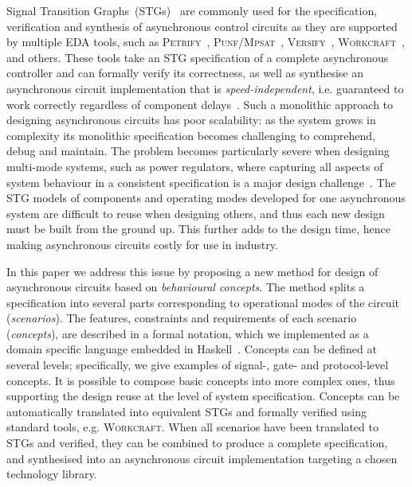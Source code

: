 \documentclass[british, journal]{IEEEtran}
\newcommand{\noun}[1]{\textsc{#1}}
\begin{document}
Signal Transition Graphs~(STGs)~\cite{Chu_1987_phd}\cite{Rosenblum_1985_tpn}
are commonly used for the specification,
verification and synthesis of asynchronous control circuits as they are
supported by multiple EDA tools, such as \noun{Petrify}~\cite{Cortadella},
\noun{Punf}/\noun{Mpsat}~\cite{khomenko2004detecting}\cite{khomenko2011mp}, \noun{Versify}~\cite{i1997formal},
\noun{Workcraft}~\cite{workcraft2016}\cite{Workcraft_website}, and others.
These tools take an STG specification of a complete asynchronous controller and
can formally verify its correctness, as well as synthesise an asynchronous
circuit implementation that is \emph{speed-independent}, i.e. guaranteed
to work correctly regardless of component delays~\cite{Muller_1959_ts}.
Such a monolithic approach to designing asynchronous circuits has
poor scalability: as the system grows in complexity its monolithic
specification becomes challenging to comprehend, debug and maintain. The problem
becomes particularly severe when designing multi-mode systems, such as
power regulators, where capturing all aspects of system behaviour in a
consistent specification is a major design
challenge~\cite{2014_sokolov_ftfc}\cite{sokolov2015design}. The STG models of
components and operating modes developed for one asynchronous system are
difficult to reuse when designing others, and thus each new design
must be built from the ground up. This further adds to the design time, hence making
asynchronous circuits costly for use in industry.

In this paper we address this issue by proposing a new method for design
of asynchronous circuits based on \emph{behavioural concepts}.
The method splits a specification into several parts corresponding
to operational modes of the circuit (\emph{scenarios}). The features,
constraints and requirements of each scenario (\emph{concepts}),
are described in a formal notation, which we implemented as a domain
specific language embedded in Haskell~\cite{1996_hudak_dsl}. Concepts can
be defined at several levels; specifically, we give examples of signal-,
gate- and protocol-level concepts. It is possible to compose basic concepts
into more complex ones, thus supporting the design reuse at the level of system
specification.
Concepts can be automatically translated into equivalent STGs and
formally verified using standard tools, e.g. \noun{Workcraft}.
When all scenarios have been translated to STGs and verified, they can be
combined to produce a complete specification, and synthesised into an
asynchronous circuit implementation targeting a chosen technology library.
\end{document}
